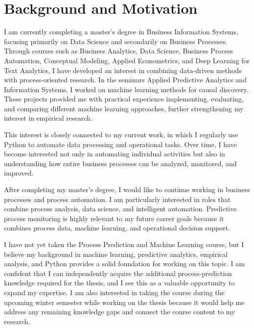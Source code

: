 \documentclass[authoryear,preprint,12pt]{elsarticle}
\begin{document}


\section{Background and Motivation}

I am currently completing a master's degree in Business Information Systems, focusing primarily on Data Science and secondarily on Business Processes. Through courses such as Business Analytics, Data Science, Business Process Automation, Conceptual Modeling, Applied Econometrics, and Deep Learning for Text Analytics, I have developed an interest in combining data-driven methods with process-oriented research. In the seminars Applied Predictive Analytics and Information Systems, I worked on machine learning methods for causal discovery. These projects provided me with practical experience implementing, evaluating, and comparing different machine learning approaches, further strengthening my interest in empirical research.

This interest is closely connected to my current work, in which I regularly use Python to automate data processing and operational tasks. Over time, I have become interested not only in automating individual activities but also in understanding how entire business processes can be analyzed, monitored, and improved.

After completing my master's degree, I would like to continue working in business processes and process automation. I am particularly interested in roles that combine process analysis, data science, and intelligent automation. Predictive process monitoring is highly relevant to my future career goals because it combines process data, machine learning, and operational decision support.

I have not yet taken the Process Prediction and Machine Learning course, but I believe my background in machine learning, predictive analytics, empirical analysis, and Python provides a solid foundation for working on this topic. I am confident that I can independently acquire the additional process-prediction knowledge required for the thesis, and I see this as a valuable opportunity to expand my expertise. I am also interested in taking the course during the upcoming winter semester while working on the thesis because it would help me address any remaining knowledge gaps and connect the course content to my research.
\end{document}
